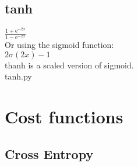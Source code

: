 \documentclass[11pt,a4paper]{article}
\begin{document}
\subsection{tanh}

$\frac{1 + \mathrm{e}^{-2x}}
	  {1 - \mathrm{e}^{-2x}}$
\\[11pt]
Or using the sigmoid function:
\\[11pt]
$2\sigma(2x) -1$
\\[11pt]
thanh is a scaled version of sigmoid.
\\[11pt]

{tanh.py}

\newpage
\section{Cost functions}

\subsection{Cross Entropy}
\end{document}
